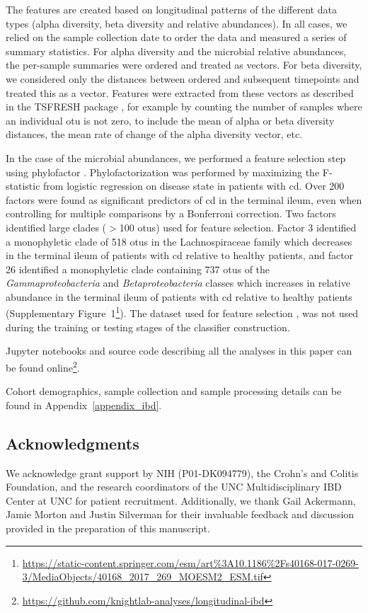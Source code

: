 The features are created based on longitudinal patterns of the different data 
types (alpha diversity, beta diversity and relative abundances). In all cases, 
we relied on the sample collection date to order the data and measured a series 
of summary statistics. For alpha diversity and the microbial relative 
abundances, the per-sample summaries were ordered and treated as vectors. For 
beta diversity, we considered only the distances between ordered and subsequent 
timepoints and treated this as a vector. Features were extracted from these 
vectors as described in the TSFRESH package \cite{RN4216}, for example by 
counting the number of samples where an individual \gls{otu} is not zero, to 
include the mean of alpha or beta diversity distances, the mean rate of change 
of the alpha diversity vector, etc.

In the case of the microbial abundances, we performed a feature selection step 
using phylofactor \cite{RN4204}. Phylofactorization was performed by maximizing 
the F-statistic from logistic regression on disease state in patients with 
\gls{cd}. Over 200 factors were found as significant predictors of \gls{cd} in 
the terminal ileum, even when controlling for multiple comparisons by a 
Bonferroni correction. Two factors identified large clades ($>$100 \glspl{otu}) 
used for feature selection. Factor 3 identified a monophyletic clade of 518 
\glspl{otu} in the Lachnospiraceae family which decreases in the terminal ileum 
of patients with \gls{cd} relative to healthy patients, and factor 26 
identified a monophyletic clade containing 737 \glspl{otu} of the 
\textit{Gammaproteobacteria} and \textit{Betaproteobacteria} classes which 
increases in relative abundance in the terminal ileum of patients with \gls{cd} 
relative to healthy patients (Supplementary 
Figure~1\footnote{\url{https://static-content.springer.com/esm/art\%3A10.1186\%2Fs40168-017-0269-3/MediaObjects/40168_2017_269_MOESM2_ESM.tif}}).  
The dataset used for feature selection \cite{RN154}, was not used during the 
training or testing stages of the classifier construction.

Jupyter notebooks and source code describing all the analyses in this paper can 
be found 
online\footnote{\url{https://github.com/knightlab-analyses/longitudinal-ibd}}.

Cohort demographics, sample collection and sample processing details can be 
found in Appendix~\ref{appendix_ibd}.

\subsection{Acknowledgments}

We acknowledge grant support by NIH (P01-DK094779), the Crohn's and Colitis 
Foundation, and the research coordinators of the UNC Multidisciplinary IBD 
Center at UNC for patient recruitment. Additionally, we thank Gail Ackermann, 
Jamie Morton and Justin Silverman for their invaluable feedback and discussion 
provided in the preparation of this manuscript.
